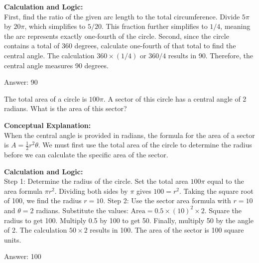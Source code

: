 \documentclass[11pt,paper=a4,answers]{exam}
\begin{document}
\begin{questions}
\begin{solution}
\vspace{30pt}

\textbf{Calculation and Logic:} \\
First, find the ratio of the given arc length to the total circumference. Divide $5\pi$ by $20\pi$, which simplifies to $5 / 20$. This fraction further simplifies to $1 / 4$, meaning the arc represents exactly one-fourth of the circle. Second, since the circle contains a total of 360 degrees, calculate one-fourth of that total to find the central angle. The calculation $360 \times (1 / 4)$ or $360 / 4$ results in 90. Therefore, the central angle measures 90 degrees.

\vspace{30pt}

Answer: \colorbox{yellow!100}{90}
\end{solution}

\vspace{60pt}

\question
The total area of a circle is $100\pi$. A sector of this circle has a central angle of 2 radians. What is the area of this sector?

\begin{solution}
\textbf{Conceptual Explanation:} \\
When the central angle is provided in radians, the formula for the area of a sector is $A = \frac{1}{2}r^2\theta$. We must first use the total area of the circle to determine the radius before we can calculate the specific area of the sector.

\vspace{30pt}

\textbf{Calculation and Logic:} \\
Step 1: Determine the radius of the circle. Set the total area $100\pi$ equal to the area formula $\pi r^2$. Dividing both sides by $\pi$ gives $100 = r^2$. Taking the square root of 100, we find the radius $r = 10$. Step 2: Use the sector area formula with $r = 10$ and $\theta = 2$ radians. Substitute the values: $\text{Area} = 0.5 \times (10)^2 \times 2$. Square the radius to get 100. Multiply 0.5 by 100 to get 50. Finally, multiply 50 by the angle of 2. The calculation $50 \times 2$ results in 100. The area of the sector is 100 square units.

\vspace{30pt}

Answer: \colorbox{yellow!100}{100}
\end{solution}


\end{questions}
\end{document}
